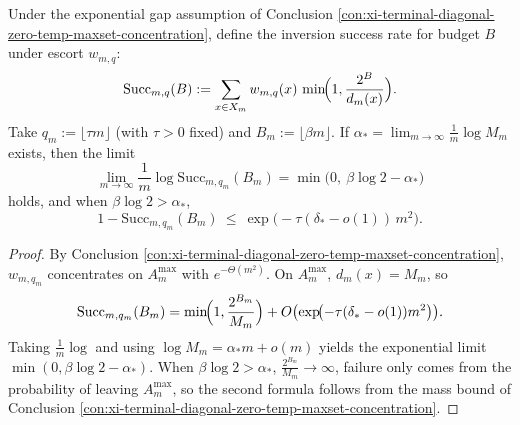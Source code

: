 \begin{conclusion}[Oracle phase diagram of diagonal escort: success rate for budget \texorpdfstring{$B=\beta m$}{B=beta m} is determined solely by \texorpdfstring{$\alpha_\ast$}{alpha*} at the \(m\) scale]\label{con:xi-terminal-diagonal-escort-oracle-phase}
Under the exponential gap assumption of Conclusion \ref{con:xi-terminal-diagonal-zero-temp-maxset-concentration}, define the inversion success rate for budget \(B\) under escort \(w_{m,q}\):
\[
\mathrm{Succ}_{m,q}(B)
:=\sum_{x\in X_m}w_{m,q}(x)\,\min\!\Bigl(1,\frac{2^{B}}{d_m(x)}\Bigr).
\]
Take \(q_m:=\lfloor\tau m\rfloor\) (with \(\tau>0\) fixed) and \(B_m:=\lfloor\beta m\rfloor\).
If \(\alpha_\ast=\lim_{m\to\infty}\frac{1}{m}\log M_m\) exists, then the limit
\[
\lim_{m\to\infty}\frac{1}{m}\log \mathrm{Succ}_{m,q_m}(B_m)
=\min\bigl(0,\ \beta\log 2-\alpha_\ast\bigr)
\]
holds, and when \(\beta\log 2>\alpha_\ast\),
\[
1-\mathrm{Succ}_{m,q_m}(B_m)\ \le\ \exp\!\bigl(-\tau(\delta_\ast-o(1))\,m^2\bigr).
\]
\end{conclusion}
\begin{proof}
By Conclusion \ref{con:xi-terminal-diagonal-zero-temp-maxset-concentration}, \(w_{m,q_m}\) concentrates on \(A_m^{\max}\) with \(e^{-\Theta(m^2)}\).
On \(A_m^{\max}\), \(d_m(x)=M_m\), so
\[
\mathrm{Succ}_{m,q_m}(B_m)
=\min\!\Bigl(1,\frac{2^{B_m}}{M_m}\Bigr)+O\bigl(\exp\!\bigl(-\tau(\delta_\ast-o(1))m^2\bigr)\bigr).
\]
Taking \(\frac1m\log\) and using \(\log M_m=\alpha_\ast m+o(m)\) yields the exponential limit
\(
\min(0,\beta\log 2-\alpha_\ast)
\).
When \(\beta\log2>\alpha_\ast\), \(\frac{2^{B_m}}{M_m}\to\infty\), failure only comes from the probability of leaving \(A_m^{\max}\),
so the second formula follows from the mass bound of Conclusion \ref{con:xi-terminal-diagonal-zero-temp-maxset-concentration}.
\end{proof}

